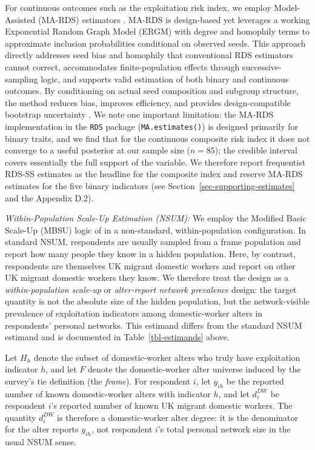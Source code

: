 \documentclass[
  12pt,
  letterpaper,
  DIV=11,
  numbers=noendperiod]{scrartcl}
\begin{document}
For continuous outcomes such as the exploitation risk index, we employ
Model-Assisted (MA-RDS) estimators \autocite{gile15-network}. MA-RDS is
design-based yet leverages a working Exponential Random Graph Model
(ERGM) with degree and homophily terms to approximate inclusion
probabilities conditional on observed seeds. This approach directly
addresses seed bias and homophily that conventional RDS estimators
cannot correct, accommodates finite-population effects through
successive-sampling logic, and supports valid estimation of both binary
and continuous outcomes. By conditioning on actual seed composition and
subgroup structure, the method reduces bias, improves efficiency, and
provides design-compatible bootstrap uncertainty
\autocite{gile11-improved}. We note one important limitation: the MA-RDS
implementation in the \texttt{RDS} package (\texttt{MA.estimates()}) is
designed primarily for binary traits, and we find that for the
continuous composite risk index it does not converge to a useful
posterior at our sample size (\(n=85\)); the credible interval covers
essentially the full support of the variable. We therefore report
frequentist RDS-SS estimates as the headline for the composite index and
reserve MA-RDS estimates for the five binary indicators (see
Section~\ref{sec-supporting-estimates} and the Appendix D.2).

\emph{Within-Population Scale-Up Estimation (NSUM):} We employ the
Modified Basic Scale-Up (MBSU) logic of \textcite{feeh16-generalizing}
in a non-standard, within-population configuration. In standard NSUM,
respondents are usually sampled from a frame population and report how
many people they know in a hidden population. Here, by contrast,
respondents are themselves UK migrant domestic workers and report on
other UK migrant domestic workers they know. We therefore treat the
design as a \emph{within-population scale-up} or \emph{alter-report
network prevalence} design: the target quantity is not the absolute size
of the hidden population, but the network-visible prevalence of
exploitation indicators among domestic-worker alters in respondents'
personal networks. This estimand differs from the standard NSUM estimand
and is documented in Table~\ref{tbl-estimands} above.

Let \(H_h\) denote the subset of domestic-worker alters who truly have
exploitation indicator \(h\), and let \(F\) denote the domestic-worker
alter universe induced by the survey's tie definition (the
\emph{frame}). For respondent \(i\), let \(y_{ih}\) be the reported
number of known domestic-worker alters with indicator \(h\), and let
\(d_i^{DW}\) be respondent \(i\)'s reported number of known UK migrant
domestic workers. The quantity \(d_i^{DW}\) is therefore a
domestic-worker alter degree: it is the denominator for the alter
reports \(y_{ih}\), not respondent \(i\)'s total personal network size
in the usual NSUM sense.
\end{document}
